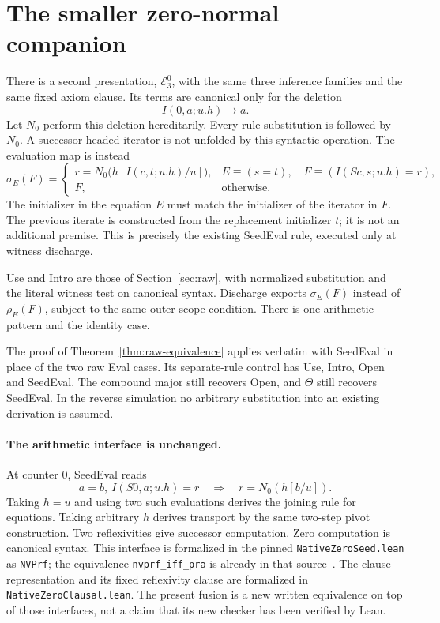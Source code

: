 \section{The smaller zero-normal companion}
\label{sec:zero}

There is a second presentation, $\mathcal E^0_3$, with the same three
inference families and the same fixed axiom clause. Its terms are canonical
only for the deletion
\[
                         I(0,a;u.h)\longrightarrow a.
\]
Let $N_0$ perform this deletion hereditarily. Every rule substitution is
followed by $N_0$. A successor-headed iterator is not unfolded by this
syntactic operation. The evaluation map is instead
\[
 \sigma_E(F)=
 \begin{cases}
  r=N_0\bigl(h[I(c,t;u.h)/u]\bigr),
    &E\equiv(s=t),\quad F\equiv(I(Sc,s;u.h)=r),\\[3pt]
  F,&\text{otherwise}.
 \end{cases}
\]
The initializer in the equation $E$ must match the initializer of the
iterator in $F$. The previous iterate is constructed from the replacement
initializer $t$; it is not an additional premise. This is precisely the
existing SeedEval rule, executed only at witness discharge.

Use and Intro are those of Section~\ref{sec:raw}, with normalized
substitution and the literal witness test on canonical syntax. Discharge
exports $\sigma_E(F)$ instead of $\rho_E(F)$, subject to the same outer
scope condition. There is one arithmetic pattern and the identity case.

The proof of Theorem~\ref{thm:raw-equivalence} applies verbatim with
SeedEval in place of the two raw Eval cases. Its separate-rule control has
Use, Intro, Open and SeedEval. The compound major still recovers Open, and
$\Theta$ still recovers SeedEval. In the reverse simulation no arbitrary
substitution into an existing derivation is assumed.

\paragraph{The arithmetic interface is unchanged.}
At counter $0$, SeedEval reads
\[
             a=b,\ I(S0,a;u.h)=r\quad\Longrightarrow\quad r=N_0(h[b/u]).
\]
Taking $h=u$ and using two such evaluations derives the joining rule for
equations. Taking arbitrary $h$ derives transport by the same two-step
pivot construction. Two reflexivities give successor computation.
Zero computation is canonical syntax. This interface is formalized in the
pinned \texttt{NativeZeroSeed.lean} as \texttt{NVPrf}; the equivalence
\texttt{nvprf\_iff\_pra} is already in that source~\cite{zeroformal}.
The clause representation and its fixed reflexivity clause are formalized
in \texttt{NativeZeroClausal.lean}. The present fusion is a new written
equivalence on top of those interfaces, not a claim that its new checker
has been verified by Lean.

